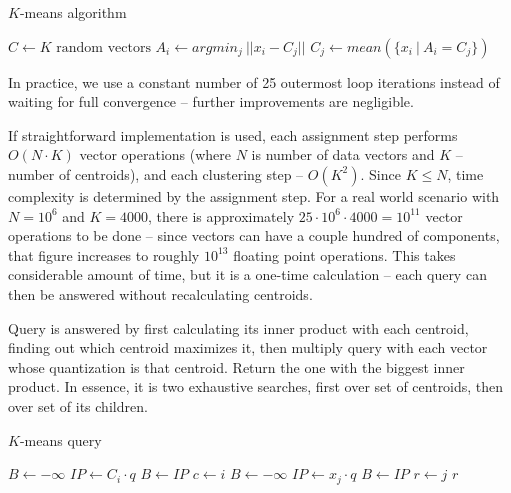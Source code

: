 \begin{algorithm}[H]
	\caption{$K$-means algorithm}
	\begin{algorithmic}
		\State $C \gets K \text{ random vectors}$
		\Repeat
				\State $A_i \gets argmin_{j} \ || x_i - C_j || $
			\EndFor
				\State $C_j \gets mean(\{x_i\ |\ A_i = C_j\}) $
			\EndFor

		\State {}
	\end{algorithmic}
\end{algorithm}

In practice, we use a constant number of 25 outermost loop iterations
instead of waiting for full convergence -- further improvements are negligible.

If straightforward implementation is used, each assignment step performs
$O(N \cdot K)$ vector operations (where $N$ is number of data vectors and
$K$ -- number of centroids), and each clustering step -- $O(K^2)$. Since
$K \le N$, time complexity is determined by the assignment step. For a real
world scenario with $N = 10^6$ and $K = 4000$, there is approximately
$25 \cdot 10^6 \cdot 4000 = 10^{11}$ vector operations to be done -- since vectors
can have a couple hundred of components, that figure increases to roughly
$10^{13}$ floating point operations. This takes considerable amount of time,
but it is a one-time calculation -- each query can then be answered without
recalculating centroids.

Query is answered by first calculating its inner product with each centroid,
finding out which centroid maximizes it, then multiply query with each vector
whose quantization is that centroid. Return the one
with the biggest inner product. In essence, it is two exhaustive searches,
first over set of centroids, then over set of its children.

\begin{algorithm}[H]
	\caption{$K$-means query}
	\begin{algorithmic}
		\State $B \gets -\infty$
		\For{$ i < K $}
			\State $IP \gets C_i \cdot q$
			\If{$IP > B$}
				\State $B \gets IP$
				\State $c \gets i$
			\EndIf
		\EndFor
		\State $B \gets -\infty$
		\For{$ j \in \{ j\ |\ A_j = c \} $}
			\State $IP \gets x_j \cdot q$
			\If {$IP > B$}
				\State $B \gets IP$
				\State $r \gets j$
			\EndIf
		\EndFor
		\State \Return $r$
	\end{algorithmic}
\end{algorithm}

